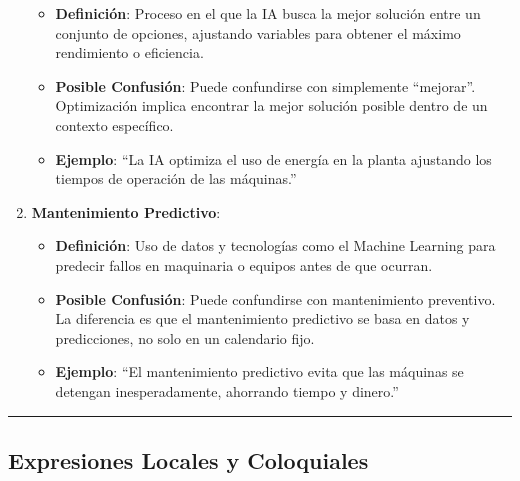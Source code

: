 \documentclass[
  10pt,
  letterpaper,
]{book}
\providecommand{\tightlist}{%
  \setlength{\itemsep}{0pt}\setlength{\parskip}{0pt}}\usepackage{longtable,booktabs,array}
\begin{document}
\begin{enumerate}
  \begin{itemize}
  \tightlist
  \item
    \textbf{Definición}: Proceso en el que la IA busca la mejor solución
    entre un conjunto de opciones, ajustando variables para obtener el
    máximo rendimiento o eficiencia.
  \item
    \textbf{Posible Confusión}: Puede confundirse con simplemente
    ``mejorar''. Optimización implica encontrar la mejor solución
    posible dentro de un contexto específico.
  \item
    \textbf{Ejemplo}: ``La IA optimiza el uso de energía en la planta
    ajustando los tiempos de operación de las máquinas.''
  \end{itemize}
\item
  \textbf{Mantenimiento Predictivo}:

  \begin{itemize}
  \tightlist
  \item
    \textbf{Definición}: Uso de datos y tecnologías como el Machine
    Learning para predecir fallos en maquinaria o equipos antes de que
    ocurran.
  \item
    \textbf{Posible Confusión}: Puede confundirse con mantenimiento
    preventivo. La diferencia es que el mantenimiento predictivo se basa
    en datos y predicciones, no solo en un calendario fijo.
  \item
    \textbf{Ejemplo}: ``El mantenimiento predictivo evita que las
    máquinas se detengan inesperadamente, ahorrando tiempo y dinero.''
  \end{itemize}
\end{enumerate}

\begin{center}\rule{0.5\linewidth}{0.5pt}\end{center}

\subsection{\texorpdfstring{\textbf{Expresiones Locales y
Coloquiales}}{Expresiones Locales y Coloquiales}}\label{expresiones-locales-y-coloquiales}
\end{document}
